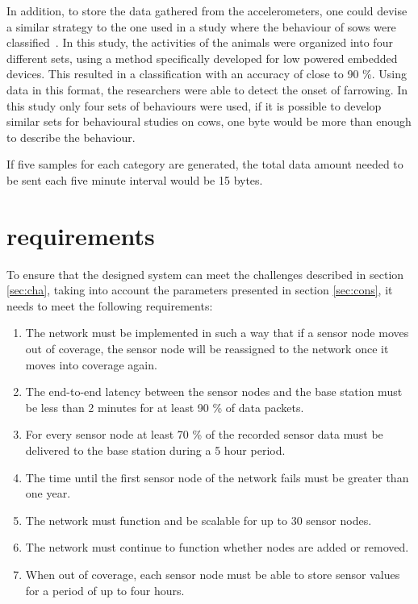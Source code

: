 \documentclass[conference]{IEEEtran}
\begin{document}
In addition, to store the data gathered from the accelerometers, one could
devise a similar strategy to the one used in a study where the behaviour of
sows were classified~\cite{marchiorosows2011}. In this study, the activities
of the animals were organized into four different sets, using a method
specifically developed for low powered embedded devices. This resulted in
a classification with an accuracy of close to 90 \%. Using data in this format,
the researchers were able to detect the onset of farrowing. In this study only
four sets of behaviours were used, if it is possible to develop similar sets
for behavioural studies on cows, one byte would be more than enough to
describe the behaviour.

If five samples for each category are generated, the total data amount needed to
be sent each five minute interval would be 15 bytes.

\section{requirements}

To ensure that the designed system can meet the challenges described in section
\ref{sec:cha}, taking into account the parameters presented in section
\ref{sec:cons}, it needs to meet the following requirements:

\begin{enumerate} 

    \item The network must be implemented in such a way that if a sensor node
        moves out of coverage, the sensor node will be reassigned to the
        network once it moves into coverage again.  
        
    \item The end-to-end latency between the sensor nodes and the base station
        must be less than 2 minutes for at least 90 \% of data packets.
        
    \item For every sensor node at least 70 \% of the recorded sensor data must
        be delivered to the base station during a 5 hour period.
        
    \item The time until the first sensor node of the network fails must be
        greater than one year.  
        
    \item The network must function and be scalable for up to 30 sensor nodes.
        
    \item The network must continue to function whether nodes are added or
        removed.
    
    \item When out of coverage, each sensor node must be able to store sensor
        values for a period of up to four hours.

\end{enumerate}
\end{document}
